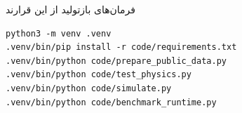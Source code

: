 فرمان‌های بازتولید از این قرارند
\begin{latin}
\begin{verbatim}
python3 -m venv .venv
.venv/bin/pip install -r code/requirements.txt
.venv/bin/python code/prepare_public_data.py
.venv/bin/python code/test_physics.py
.venv/bin/python code/simulate.py
.venv/bin/python code/benchmark_runtime.py
\end{verbatim}
\end{latin}
